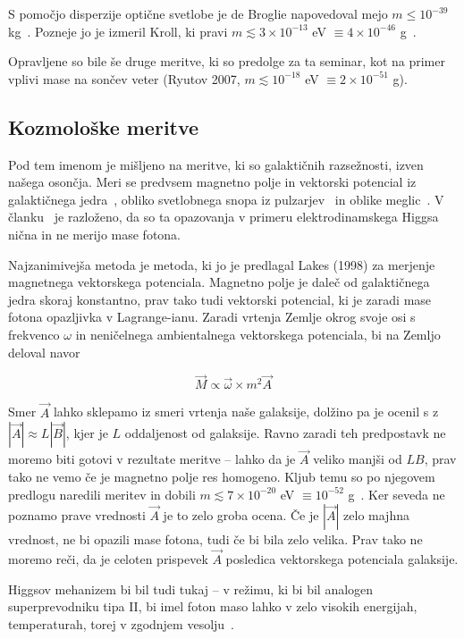 \documentclass[a4paper, twocolumn, titlepage]{article}
\newcommand{\w}{
	\ensuremath{\omega}
}
\begin{document}
S pomočjo disperzije optične svetlobe je de Broglie napovedoval mejo $m \leq 10^{-39}$ kg~\cite{nieto2}. Pozneje jo je
izmeril Kroll, ki pravi $m \lesssim 3 \times 10^{-13}$ eV $\equiv 4 \times 10^{-46}$ g~\cite{nieto2}.

Opravljene so bile še druge meritve, ki so predolge za ta seminar, kot na primer vplivi mase na sončev veter (Ryutov 2007,
$m \lesssim 10^{-18}$ eV $\equiv 2\times10^{-51}$ g).

\subsection{Kozmološke meritve}

Pod tem imenom je mišljeno na meritve, ki so galaktičnih razsežnosti, izven našega osončja. Meri se predvsem magnetno polje in
vektorski potencial iz galaktičnega jedra~\cite{over}, obliko svetlobnega snopa iz pulzarjev~\cite{nieto1} in oblike
meglic~\cite{nieto2}. V članku~\cite{higgs} je razloženo, da so ta opazovanja v primeru elektrodinamskega Higgsa nična in
ne merijo mase fotona.

Najzanimivejša metoda je metoda, ki jo je predlagal Lakes (1998) za merjenje magnetnega vektorskega potenciala. Magnetno
polje je daleč od galaktičnega jedra skoraj konstantno, prav tako tudi vektorski potencial, ki je zaradi mase fotona
opazljivka v Lagrange-ianu. Zaradi vrtenja Zemlje okrog svoje osi s frekvenco $\w$ in neničelnega ambientalnega vektorskega
potenciala, bi na Zemljo deloval navor

\begin{equation}
	\vec{M} \propto \vec{\w} \times m^2\vec{A}
\end{equation}

Smer $\vec{A}$ lahko sklepamo iz smeri vrtenja naše galaksije, dolžino pa je ocenil s z $|\vec{A}| \approx L|\vec{B}|$, kjer
je $L$ oddaljenost od galaksije. Ravno zaradi teh predpostavk ne moremo biti gotovi v rezultate meritve -- lahko da je
$\vec{A}$ veliko manjši od $LB$, prav tako ne vemo če je magnetno polje res homogeno. Kljub temu so po njegovem predlogu
naredili meritev in dobili $m \lesssim 7 \times 10^{-20}$ eV $\equiv 10^{-52}$ g~\cite{nieto2}. Ker seveda ne poznamo prave
vrednosti $\vec{A}$ je to zelo groba ocena. Če je $|\vec{A}|$ zelo majhna vrednost, ne bi opazili mase fotona, tudi če bi
bila zelo velika. Prav tako ne moremo reči, da je celoten prispevek $\vec{A}$ posledica vektorskega potenciala galaksije.

Higgsov mehanizem bi bil tudi tukaj -- v režimu, ki bi bil analogen superprevodniku tipa II, bi imel foton maso lahko v zelo
visokih energijah, temperaturah, torej v zgodnjem vesolju~\cite{nieto2}.
\end{document}

